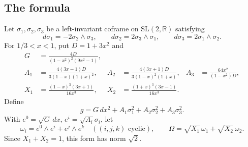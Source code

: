 \documentclass[11pt,a4paper]{article}
\theoremstyle{definition}
\theoremstyle{remark}
\newcommand{\R}{\mathbb R}
\begin{document}
\subsection{The formula}
Let $\sigma_1,\sigma_2,\sigma_3$ be a left-invariant coframe on $\mathrm{SL}(2,\R)$ satisfying
\begin{equation}\label{eq:sl2}
 d\sigma_1=-2\sigma_2\wedge\sigma_3,\qquad
 d\sigma_2=2\sigma_3\wedge\sigma_1,\qquad
 d\sigma_3=2\sigma_1\wedge\sigma_2.
\end{equation}
For $1/3<x<1$, put $D=1+3x^2$ and
\begin{align*}
 G&=\frac{4D}{(1-x^2)^2(9x^2-1)},\\
 A_1&=\frac{4(3x-1)D}{3(1-x)(1+x)^2},&
 A_2&=\frac{4(3x+1)D}{3(1-x)^2(1+x)},&
 A_3&=\frac{64x^2}{(1-x^2)D},\\
 X_1&=\frac{(1-x)^3(3x+1)}{16x^3},&
 X_2&=\frac{(1+x)^3(3x-1)}{16x^3}.
\end{align*}
Define
\begin{equation}\label{eq:modelmetric}
 g=G\,dx^2+A_1\sigma_1^2+A_2\sigma_2^2+A_3\sigma_3^2.
\end{equation}
With $e^0=\sqrt G\,dx$, $e^i=\sqrt{A_i}\sigma_i$, let
\[
 \omega_i=e^0\wedge e^i+e^j\wedge e^k
 \quad ((i,j,k)\text{ cyclic}),\qquad
 \Omega=\sqrt{X_1}\,\omega_1+\sqrt{X_2}\,\omega_2.
\]
Since $X_1+X_2=1$, this form has norm $\sqrt2$.
\end{document}
